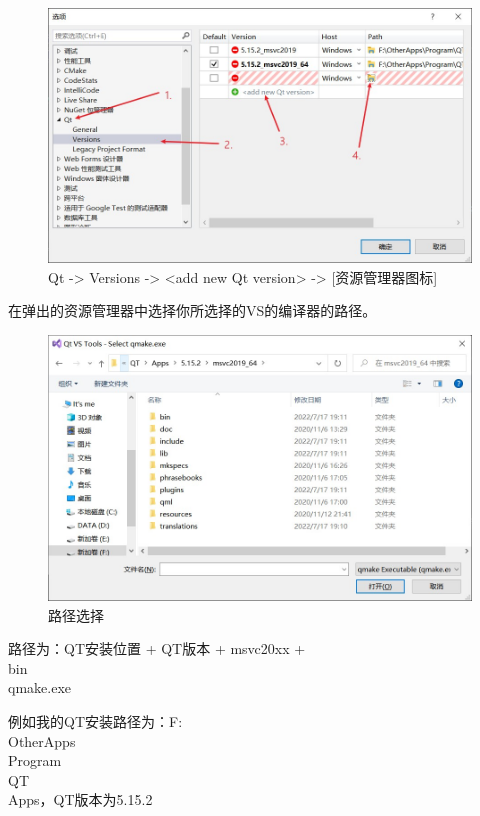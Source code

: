 \documentclass[cs4size,a4paper]{ctexart}
\numberwithin{equation}{section}
\numberwithin{table}{section}
\numberwithin{figure}{section}
\begin{document}
\begin{figure}[H]
\small
\centering
\includegraphics[width=\textwidth]{Qt - Versions - add new Qt version - [资源管理器图标].jpg}
\caption{Qt -> Versions -> <add new Qt version> -> [资源管理器图标]} \label{fig:Qt -> Versions -> <add new Qt version> -> [资源管理器图标]}
\end{figure}

在弹出的\colorbox{LetMeFlyGray}{资源管理器}中选择你所选择的\colorbox{LetMeFlyGray}{VS}的编译器的路径。

\begin{figure}[H]
\small
\centering
\includegraphics[width=\textwidth]{路径选择.jpg}
\caption{路径选择} \label{fig:路径选择}
\end{figure}

路径为：\colorbox{LetMeFlyGray}{QT安装位置 + QT版本 + msvc20xx + \\bin\\qmake.exe}

例如我的QT安装路径为：\colorbox{LetMeFlyGray}{F:\\OtherApps\\Program\\QT\\Apps}，QT版本为\colorbox{LetMeFlyGray}{5.15.2}
\end{document}
